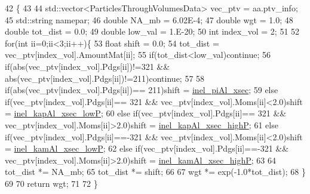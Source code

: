 \begin{DoxyCode}
42                                                                                 \{
43     
44     std::vector<ParticlesThroughVolumesData>  vec\_ptv = aa.ptv\_info;
45     std::string namepar;
46     \textcolor{keywordtype}{double} NA\_mb    = 6.02E-4;
47     \textcolor{keywordtype}{double} wgt      = 1.0;
48     \textcolor{keywordtype}{double} tot\_dist = 0.0;
49     \textcolor{keywordtype}{double} low\_val  = 1.E-20;   
50     \textcolor{keywordtype}{int} index\_vol   = 2;
51     
52     \textcolor{keywordflow}{for}(\textcolor{keywordtype}{int} ii=0;ii<3;ii++)\{
53       \textcolor{keywordtype}{float} shift = 0.0;
54       tot\_dist = vec\_ptv[index\_vol].AmountMat[ii];
55       \textcolor{keywordflow}{if}(tot\_dist<low\_val)\textcolor{keywordflow}{continue};
56       \textcolor{keywordflow}{if}(abs(vec\_ptv[index\_vol].Pdgs[ii])!=321 && abs(vec\_ptv[index\_vol].Pdgs[ii])!=211)\textcolor{keywordflow}{continue};
57       
58       \textcolor{keywordflow}{if}(abs(vec\_ptv[index\_vol].Pdgs[ii])== 211)shift = \hyperlink{class_neutrino_flux_reweight_1_1_absorption_d_v_o_l_reweighter_ab70c49c8fc53548eed60cca86589ae98}{inel\_piAl\_xsec};
59       \textcolor{keywordflow}{else} \textcolor{keywordflow}{if}(vec\_ptv[index\_vol].Pdgs[ii]== 321 && vec\_ptv[index\_vol].Moms[ii]<2.0)shift = 
      \hyperlink{class_neutrino_flux_reweight_1_1_absorption_d_v_o_l_reweighter_a2d57ad8d135f3874fe5636f9a30ceea1}{inel\_kapAl\_xsec\_lowP};
60       \textcolor{keywordflow}{else} \textcolor{keywordflow}{if}(vec\_ptv[index\_vol].Pdgs[ii]== 321 && vec\_ptv[index\_vol].Moms[ii]>2.0)shift = 
      \hyperlink{class_neutrino_flux_reweight_1_1_absorption_d_v_o_l_reweighter_a980a548cffd4ca6fb3df8e146f11a30d}{inel\_kapAl\_xsec\_highP};
61       \textcolor{keywordflow}{else} \textcolor{keywordflow}{if}(vec\_ptv[index\_vol].Pdgs[ii]==-321 && vec\_ptv[index\_vol].Moms[ii]<2.0)shift = 
      \hyperlink{class_neutrino_flux_reweight_1_1_absorption_d_v_o_l_reweighter_aaed12a6a79b561923f5f426de474f006}{inel\_kamAl\_xsec\_lowP};
62       \textcolor{keywordflow}{else} \textcolor{keywordflow}{if}(vec\_ptv[index\_vol].Pdgs[ii]==-321 && vec\_ptv[index\_vol].Moms[ii]>2.0)shift = 
      \hyperlink{class_neutrino_flux_reweight_1_1_absorption_d_v_o_l_reweighter_a75a48086a64722329b58cd1e099933c4}{inel\_kamAl\_xsec\_highP};
63     
64       tot\_dist *= NA\_mb;
65       tot\_dist *= shift;
66       
67       wgt *= exp(-1.0*tot\_dist);   
68     \}
69     
70     \textcolor{keywordflow}{return} wgt;
71     
72   \}
\end{DoxyCode}
